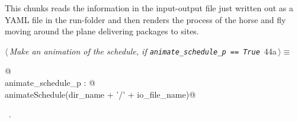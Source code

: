 \documentclass[11.5pt]{report}
\begin{document}
\vspace{-0.8cm} \newchunk This chunks reads the information in the input-output file just written out as
a YAML file in the run-folder and then renders the process of the horse and fly moving around the plane 
delivering packages to sites. 

\begin{flushleft} \small
\begin{minipage}{\linewidth}\label{scrap61}\raggedright\small
{} $\langle\,${\itshape Make an animation of the schedule, if \verb|animate_schedule_p == True|}\nobreak\ {\footnotesize {44a}}$\,\rangle\equiv$
\vspace{-1ex}
\begin{list}{}{} \item
\mbox{}\verb@   @\\
\mbox{}\verb@if animate_schedule_p : @\\
\mbox{}\verb@     animateSchedule(dir_name + '/' + io_file_name)@\\
\mbox{}\verb@@{\NWsep}
\end{list}
\vspace{-1.5ex}
\footnotesize
\begin{list}{}{\setlength{\itemsep}{-\parsep}\setlength{\itemindent}{-\leftmargin}}
\item \NWtxtMacroRefIn\ .

\item{}
\end{list}
\end{minipage}\vspace{4ex}
\end{flushleft}

\vspace{-0.8cm}\newchunk 
\end{document}
